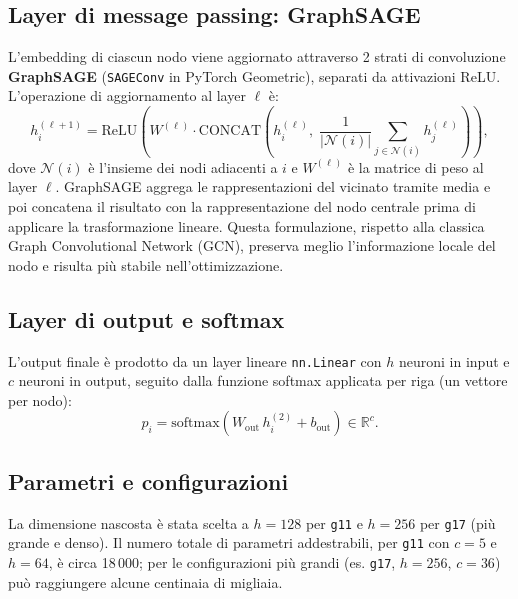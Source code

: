 \documentclass[11pt, a4paper]{article}
\begin{document}
\subsection*{Layer di message passing: GraphSAGE}

L'embedding di ciascun nodo viene aggiornato attraverso 2 strati di convoluzione
\textbf{GraphSAGE} (\texttt{SAGEConv} in PyTorch Geometric), separati da attivazioni
ReLU. L'operazione di aggiornamento al layer $\ell$ è:
\begin{equation}
    h_i^{(\ell+1)} = \mathrm{ReLU}\!\left(
        W^{(\ell)} \cdot \mathrm{CONCAT}\!\left(
            h_i^{(\ell)},\;
            \frac{1}{|\mathcal{N}(i)|}\sum_{j \in \mathcal{N}(i)} h_j^{(\ell)}
        \right)
    \right),
\end{equation}
dove $\mathcal{N}(i)$ è l'insieme dei nodi adiacenti a $i$ e $W^{(\ell)}$ è la matrice di
peso al layer $\ell$. GraphSAGE aggrega le rappresentazioni del vicinato tramite media e
poi concatena il risultato con la rappresentazione del nodo centrale prima di applicare la
trasformazione lineare. Questa formulazione, rispetto alla classica Graph Convolutional
Network (GCN), preserva meglio l'informazione locale del nodo e risulta più stabile
nell'ottimizzazione.

\subsection*{Layer di output e softmax}

L'output finale è prodotto da un layer lineare \texttt{nn.Linear} con $h$ neuroni in input
e $c$ neuroni in output, seguito dalla funzione softmax applicata per riga (un vettore per
nodo):
\begin{equation}
    p_i = \mathrm{softmax}\!\left(W_{\mathrm{out}}\, h_i^{(2)} + b_{\mathrm{out}}\right)
    \in \mathbb{R}^c.
\end{equation}

\subsection*{Parametri e configurazioni}

La dimensione nascosta è stata scelta a $h = 128$ per \texttt{g11} e $h = 256$ per
\texttt{g17} (più grande e denso). Il numero totale di parametri addestrabili, per
\texttt{g11} con $c = 5$ e $h = 64$, è circa 18\,000; per le configurazioni più grandi
(es. \texttt{g17}, $h = 256$, $c = 36$) può raggiungere alcune centinaia di migliaia.
\end{document}
